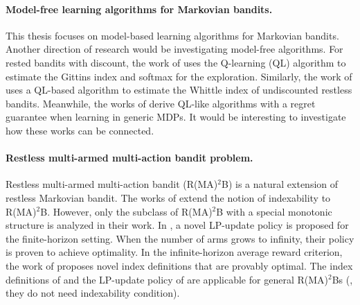 \paragraph{Model-free learning algorithms for Markovian bandits.}
This thesis focuses on model-based learning algorithms for Markovian bandits. 
Another direction of research would be investigating model-free algorithms.
For rested bandits with discount, the work of \cite{duff1995q} uses the Q-learning (QL) algorithm to estimate the Gittins index and softmax for the exploration.
Similarly, the work of \cite{avrachenkov2022whittle} uses a QL-based algorithm to estimate the Whittle index of undiscounted restless bandits.
Meanwhile, the works of \cite{jin2018q, wei2020model} derive QL-like algorithms with a regret guarantee when learning in generic MDPs.
It would be interesting to investigate how these works can be connected.

\paragraph{Restless multi-armed multi-action bandit problem.}
Restless multi-armed multi-action bandit (R(MA)$^2$B) is a natural extension of restless Markovian bandit.
The works of \cite{glazebrook2011general,hodge2015asymptotic} extend the notion of indexability to R(MA)$^2$B.
However, only the subclass of R(MA)$^2$B with a special monotonic structure is analyzed in their work.
In \cite{gast2022lp}, a novel LP-update policy is proposed for the finite-horizon setting.
When the number of arms grows to infinity, their policy is proven to achieve optimality.
In the infinite-horizon average reward criterion, the work of \cite{xiong2022learning} proposes novel index definitions that are provably optimal.
The index definitions of \cite{xiong2022learning} and the LP-update policy of \cite{gast2022lp} are applicable for general R(MA)$^2$Bs (\ie, they do not need indexability condition).



